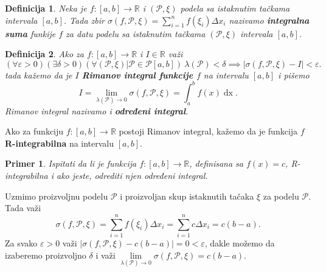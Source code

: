 \documentclass{article}
\newtheorem{definicija}{Definicija}[section]
\newtheorem{prim}{Primer}[section]
\DeclareMathOperator{\dx}{dx}
\begin{document}
\begin{defbox}
    \label{definicija_2.2}
    \begin{definicija}
        Neka je $f:\left[a,b\right]\longrightarrow\mathbb{R}$ i $\left(\mathcal{P},\xi\right)$ podela sa istaknutim tačkama intervala $\left[a,b\right]$. Tada zbir
        $\displaystyle\sigma\left(f,\mathcal{P},\xi\right)=\sum_{i=1}^{n}f\left(\xi_i\right)\varDelta x_i$ nazivamo \textbf{integralna suma} funkije $f$ za datu podelu
        sa istaknutim tačkama $\left(\mathcal{P},\xi\right)$ intervala $\left[a,b\right]$.
    \end{definicija}
\end{defbox}

\begin{defbox}
    \label{definicija_2.3}
    \begin{definicija}
        Ako za $f: \left[a,b\right]\longrightarrow\mathbb{R}$ i $I\in\mathbb{R}$ važi
        $$\left(\forall\varepsilon>0\right)\left(\exists\delta>0\right)\left(\forall\left(\mathcal{P},\xi\right)\big|\mathcal{P}\in\mathcal{P}\left[a,b\right]\right)\ \lambda\left(\mathcal{P}\right)<\delta\implies|\sigma\left(f,\mathcal{P},\xi\right)-I|<\varepsilon.$$
        tada kažemo da je $I$ \textbf{Rimanov integral funkcije $f$} na intervalu $\left[a,b\right]$ i pišemo
        $$I=\lim\limits_{\lambda\left(\mathcal{P}\right)\rightarrow 0}\sigma\left(f,\mathcal{P},\xi\right)=\int_{a}^{b}f\left(x\right)\dx.$$
        Rimanov integral nazivamo i \textbf{određeni integral}.
    \end{definicija}
\end{defbox}

Ako za funkciju $f:\left[a,b\right]\longrightarrow\mathbb{R}$ postoji Rimanov integral, kažemo da je funkcija $f$ \textbf{R-integrabilna} na intervalu $\left[a,b\right]$.

\begin{primbox}
    \label{primer_2.1}
    \begin{prim}
        Ispitati da li je funkcija $f: \left[a,b\right]\longrightarrow\mathbb{R}$, definisana sa $f\left(x\right)=c$, R-integrabilna i ako jeste, odrediti njen određeni integral.
    \end{prim}
    Uzmimo proizvoljnu podelu $\mathcal{P}$ i proizvoljan skup istaknutih tačaka $\xi$ za podelu $\mathcal{P}$. Tada važi
    \begin{equation}
        \label{primer_2.1:eq1}
        \sigma\left(f,\mathcal{P},\xi\right)=\sum_{i=1}^{n} f\left(\xi_i\right)\Delta x_i=\sum_{i=1}^{n} c\Delta x_i=c\left(b-a\right).
    \end{equation}
    Za svako $\varepsilon>0$ važi $\left|\sigma\left(f,\mathcal{P},\xi\right)-c(b-a)\right|=0<\varepsilon$, dakle možemo da
    izaberemo proizvoljno $\delta$ i važi
    $\lim\limits_{\lambda\left(\mathcal{P}\right)\rightarrow0} \sigma\left(f,\mathcal{P},\xi\right)=c(b-a)$.
\end{primbox}
\end{document}

